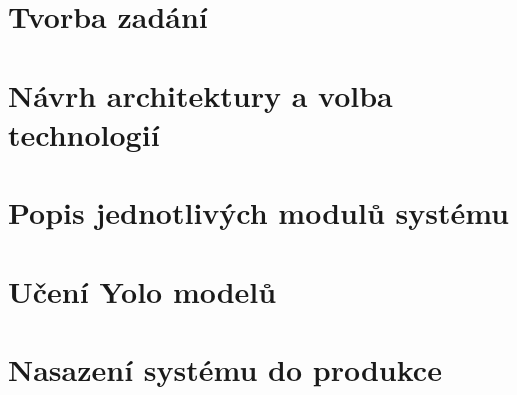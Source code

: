 \newpage
\chapter{Tvorba zadání}\label{ch:tvorba-zadani}
\newcommand{\textcolorname}{black}
\textcolor{\textcolorname}{}

\newpage
\chapter{Návrh architektury a volba technologií}\label{ch:navrh-architektury-a-volba-technologii}
\textcolor{\textcolorname}{}

\newpage
\chapter{Popis jednotlivých modulů systému}\label{ch:popis-jednotlivych-modulu}
\textcolor{\textcolorname}{}
\textcolor{\textcolorname}{}
\textcolor{\textcolorname}{}
\textcolor{\textcolorname}{}
\textcolor{\textcolorname}{}
\textcolor{\textcolorname}{}
\textcolor{\textcolorname}{}
\textcolor{\textcolorname}{}
\textcolor{\textcolorname}{}
\textcolor{\textcolorname}{}
\textcolor{\textcolorname}{}
\textcolor{\textcolorname}{}
\textcolor{\textcolorname}{}

\newpage
\chapter{Učení Yolo modelů}\label{ch:uceni_yolo_modelu}
\textcolor{\textcolorname}{}
\newpage
\textcolor{\textcolorname}{}

\newpage
\chapter{Nasazení systému do produkce}\label{ch:nasazeni-systemu-do-produkce}
\textcolor{\textcolorname}{}

